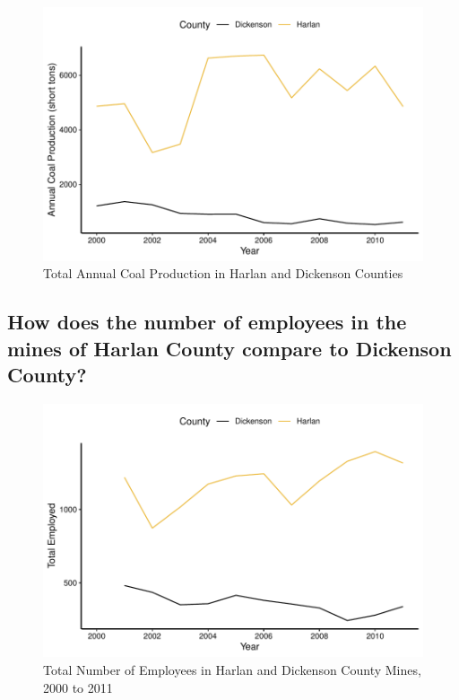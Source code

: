 \documentclass[12pt,]{article}
\begin{document}
\begin{figure}
\centering
\includegraphics{Smith_ENV872_Project_files/figure-latex/unnamed-chunk-14-1.pdf}
\caption{\label{fig:figs} Total Annual Coal Production in Harlan and
Dickenson Counties}
\end{figure}

\hypertarget{how-does-the-number-of-employees-in-the-mines-of-harlan-county-compare-to-dickenson-county}{%
\subsection{How does the number of employees in the mines of Harlan
County compare to Dickenson
County?}\label{how-does-the-number-of-employees-in-the-mines-of-harlan-county-compare-to-dickenson-county}}

\begin{figure}
\centering
\includegraphics{Smith_ENV872_Project_files/figure-latex/unnamed-chunk-15-1.pdf}
\caption{\label{fig:figs} Total Number of Employees in Harlan and
Dickenson County Mines, 2000 to 2011}
\end{figure}
\end{document}
